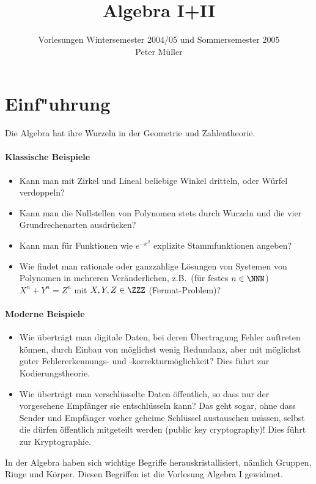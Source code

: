 \documentclass[12pt,a4paper,twoside]{article}
\begin{document}
\title{Algebra I+II}
\author{Vorlesungen Wintersemester 2004/05 und Sommersemester 2005\\
Peter M\"uller}
\maketitle
\tableofcontents
\section{Einf"uhrung}
Die Algebra hat ihre Wurzeln in der Geometrie und Zahlentheorie.
\paragraph{Klassische Beispiele}
\begin{itemize}
\item Kann man mit Zirkel und Lineal beliebige Winkel dritteln, oder
  W\"urfel verdoppeln?
\item Kann man die Nullstellen von Polynomen stets durch Wurzeln und die
  vier Grundrechenarten ausdr\"ucken?
\item Kann man f\"ur Funktionen wie $e^{-x^2}$ explizite Stammfunktionen
  angeben?
\item Wie findet man rationale oder ganzzahlige L\"osungen von Systemen
  von Polynomen in mehreren Ver\"anderlichen, z.B.\ (f\"ur festes $n\in\NNN$)
  $X^n+Y^n=Z^n$ mit $X,Y,Z\in\ZZZ$ (Fermat-Problem)?
\end{itemize}
\paragraph{Moderne Beispiele}
\begin{itemize}
\item Wie \"ubertr\"agt man digitale Daten, bei deren \"Ubertragung Fehler
  auftreten k\"onnen, durch Einbau von m\"oglichst wenig Redundanz, aber mit
  m\"oglichst guter Fehlererkennungs- und -korrekturm\"oglichkeit? Dies
  f\"uhrt zur Kodierungstheorie.
\item Wie \"ubertr\"agt man verschl\"usselte Daten \"offentlich, so dass nur
  der vorgesehene Empf\"anger sie entschl\"usseln kann? Das geht sogar, ohne
  dass Sender und Empf\"anger vorher geheime Schl\"ussel austauschen m\"ussen,
  selbst die d\"urfen \"offentlich mitgeteilt werden (public key
  cryptography)! Dies f\"uhrt zur Kryptographie.
\end{itemize}
In der Algebra haben sich wichtige Begriffe herauskristallisiert, n\"amlich
Gruppen, Ringe und K\"orper. Diesen Begriffen ist die Vorlesung Algebra I
gewidmet.
\end{document}
